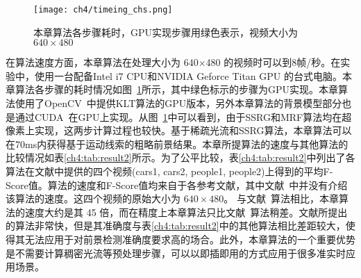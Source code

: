 \begin{figure}[!htbp]
\begin{center}
  \texttt{[image: ch4/timeing\_chs.png]}

\end{center}

\caption{本章算法各步骤耗时，GPU实现步骤用绿色表示，视频大小为 $640\times480$}
\label{ch4:fig:timing}       %
\end{figure}
在算法速度方面，本章算法在处理大小为 640$\times$480 的视频时可以到8帧/秒。在实验中，使用一台配备Intel i7 CPU和NVIDIA Geforce Titan GPU 的台式电脑。本章算法各步骤的耗时情况如图~\ref{ch4:fig:timing}所示，其中绿色标示的步骤为GPU实现。本章算法使用了OpenCV~\cite{opencv_library}中提供KLT算法的GPU版本，另外本章算法的背景模型部分也是通过CUDA~\cite{CUDA}在GPU上实现。从图~\ref{ch4:fig:timing}中可以看到，由于SSRG和MRF算法均在超像素上实现，这两步计算过程也较快。基于稀疏光流和SSRG算法，本章算法可以在70ms内获得基于运动线索的粗略前景结果。本章所提算法的速度与其他算法的比较情况如表\ref{ch4:tab:result2}所示。为了公平比较，表\ref{ch4:tab:result2}中列出了各算法在文献中提供的四个视频(cars1, cars2, people1, people2)上得到的平均F-Score值。算法的速度和F-Score值均来自于各参考文献，其中文献~中并没有介绍该算法的速度。这四个视频的原始大小为 $640\times480$。 与文献~算法相比，本章算法的速度大约是其 45 倍，而在精度上本章算法只比文献~算法稍差。文献所提出的算法非常快，但是其准确度与表\ref{ch4:tab:result2}中的其他算法相比差距较大，使得其无法应用于对前景检测准确度要求高的场合。此外，本章算法的一个重要优势是不需要计算稠密光流等预处理步骤，可以以即插即用的方式应用于很多准实时应用场景。
